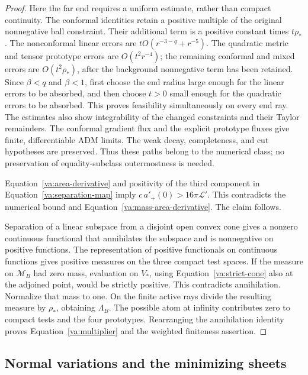 \begin{proof}
Here the far end requires a uniform estimate, rather than compact
continuity.  The conformal identities retain a positive multiple of
the original nonnegative ball constraint.  Their additional term is a
positive constant times \(t\rho_*\).  The nonconformal linear errors are
\(tO(r^{-3-q}+r^{-5})\).  The quadratic metric and tensor prototype
errors are \(O(t^2r^{-4})\); the remaining conformal and mixed errors
are \(O(t^2\rho_*)\), after the background nonnegative term has been
retained.  Since \(\beta<q\) and \(\beta<1\), first choose the end radius
large enough for the linear errors to be absorbed, and then choose
\(t>0\) small enough for the quadratic errors to be absorbed.  This
proves feasibility simultaneously on every end ray.  The estimates also
show integrability of the changed constraints and their Taylor
remainders.  The conformal gradient flux and the explicit prototype
fluxes give finite, differentiable ADM limits.  The weak decay,
completeness, and cut hypotheses are preserved.  Thus these paths belong
to the numerical class; no preservation of equality-subclass
outermostness is needed.

Equation~\eqref{va:area-derivative} and positivity of the third component
in Equation~\eqref{va:separation-map} imply
\(c\,a'_+(0)>16\pi\mathcal L'\).  This contradicts the numerical bound
and Equation~\eqref{va:mass-area-derivative}.  The claim follows.

Separation of a linear subspace from a disjoint open convex cone gives
a nonzero continuous functional that annihilates the subspace and is
nonnegative on positive functions.  The representation of positive
functionals on continuous functions gives positive measures on the three
compact test spaces.  If the measure on \(\mathcal M_B\) had zero mass,
evaluation on \(V_*\), using Equation~\eqref{va:strict-cone} also at the
adjoined point, would be strictly positive.  This contradicts
annihilation.  Normalize that mass to one.  On the finite active rays
divide the resulting measure by \(\rho_*\), obtaining \(\Lambda_B\).
The possible atom at infinity contributes zero to compact tests and the
four prototypes.  Rearranging the annihilation identity proves
Equation~\eqref{va:multiplier} and the weighted finiteness assertion.
\end{proof}

\subsection{Normal variations and the minimizing sheets}

